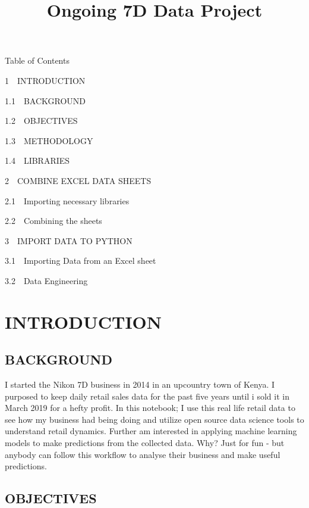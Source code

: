 \documentclass[11pt]{article}
\title{Ongoing 7D Data Project}
\begin{document}
    
    
    \maketitle
    
    

    
    Table of Contents{}

{{1~~}INTRODUCTION}

{{1.1~~}BACKGROUND}

{{1.2~~}OBJECTIVES}

{{1.3~~}METHODOLOGY}

{{1.4~~}LIBRARIES}

{{2~~}COMBINE EXCEL DATA SHEETS}

{{2.1~~}Importing necessary libraries}

{{2.2~~}Combining the sheets}

{{3~~}IMPORT DATA TO PYTHON}

{{3.1~~}Importing Data from an Excel sheet}

{{3.2~~}Data Engineering}

    \hypertarget{introduction}{%
\section{INTRODUCTION}\label{introduction}}

    \hypertarget{background}{%
\subsection{BACKGROUND}\label{background}}

    I started the Nikon 7D business in 2014 in an upcountry town of Kenya. I
purposed to keep daily retail sales data for the past five years until i
sold it in March 2019 for a hefty profit. In this notebook; I use this
real life retail data to see how my business had being doing and utilize
open source data science tools to understand retail dynamics. Further am
interested in applying machine learning models to make predictions from
the collected data. Why? Just for fun - but anybody can follow this
workflow to analyse their business and make useful predictions.

    \hypertarget{objectives}{%
\subsection{OBJECTIVES}\label{objectives}}
\end{document}
